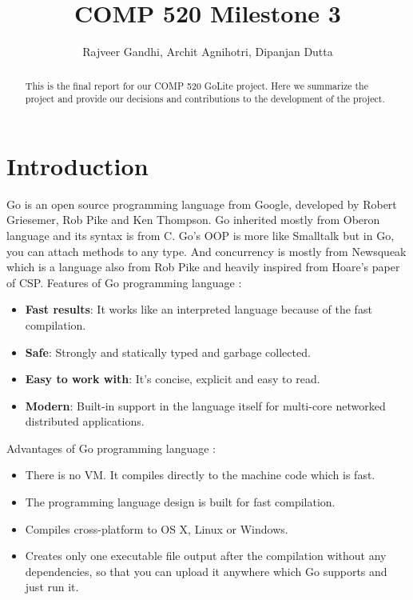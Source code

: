 \documentclass[a4paper]{article}
\title{COMP 520 Milestone 3}
\author{Rajveer Gandhi, Archit Agnihotri, Dipanjan Dutta}
\date{}
\begin{document}
\maketitle

\begin{abstract}
This is the final report for our COMP 520 GoLite project. Here we summarize the project and provide our decisions and contributions to the development of the project. 
\end{abstract}

\section{Introduction}

Go is an open source programming language from Google, developed by Robert Griesemer, Rob Pike and Ken Thompson. Go inherited mostly from Oberon language and its syntax is from C. Go’s OOP is more like Smalltalk but in Go, you can attach methods to any type. And concurrency is mostly from Newsqueak which is a language also from Rob Pike and heavily inspired from Hoare’s paper of CSP. 
\newline \newline 
Features of Go programming language : 
\begin{itemize} 
	\item \textbf{Fast results}: It works like an interpreted language because of the fast compilation. 
    \item \textbf{Safe}: Strongly and statically typed and garbage collected. 
    \item \textbf{Easy to work with}: It’s concise, explicit and easy to read.
    \item \textbf{Modern}: Built-in support in the language itself for multi-core networked distributed applications.
\end{itemize}
Advantages of Go programming language : 
\begin{itemize}
	\item There is no VM. It compiles directly to the machine code which is fast.
    \item The programming language design is built for fast compilation.
    \item Compiles cross-platform to OS X, Linux or Windows. 
    \item Creates only one executable file output after the compilation without any dependencies, so that you can upload it anywhere which Go supports and just run it.
\end{itemize}
\end{document}
